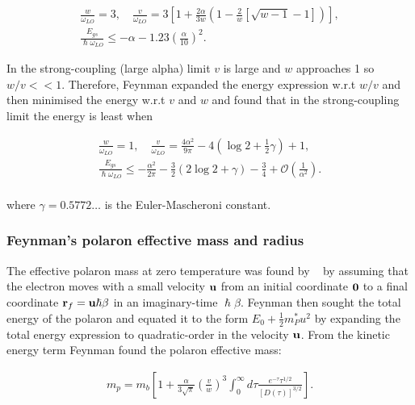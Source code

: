 \begin{equation}
\begin{gathered}
    \label{eqn:weak_gs_feynman}
    \frac{w}{\omega_{LO}} = 3, \quad \frac{v}{\omega_{LO}} = 3 \left[ 1 + \frac{2\alpha}{3w} \left(1 -\frac{2}{w} \left[ \sqrt{w-1}-1 \right] \right) \right] ,\\
    \frac{E_{gs}}{\hslash\omega_{LO}} \leq -\alpha - 1.23 \left(\frac{\alpha}{10}\right)^2 .
\end{gathered}
\end{equation}

In the strong-coupling (large alpha) limit $v$ is large and $w$ approaches 1 so $w / v << 1$. Therefore, Feynman expanded the energy expression w.r.t $w / v$ and then minimised the energy w.r.t $v$ and $w$ and found that in the strong-coupling limit the energy is least when 

\begin{equation}
\begin{gathered}
    \label{eqn:strong_gs_feynman}
    \frac{w}{\omega_{LO}} = 1, \quad \frac{v}{\omega_{LO}} = \frac{4\alpha^2}{9\pi} - 4\left( \log2 + \frac{1}{2} \gamma \right) + 1 , \\
    \frac{E_{gs}}{\hslash\omega_{LO}} \leq -\frac{\alpha^2}{2\pi} - \frac{3}{2}(2\log2+\gamma)-\frac{3}{4} + \mathcal{O}\left(\frac{1}{\alpha^2}\right) . \\
\end{gathered}
\end{equation}

where $\gamma = 0.5772 \dots$ is the Euler-Mascheroni constant. 

\subsubsection{Feynman's polaron effective mass and radius}

The effective polaron mass at zero temperature was found by ~\cite{feynman_slow_1955} by assuming that the electron moves with a small velocity $\vb{u}$ from an initial coordinate $\vb{0}$ to a final coordinate $\vb{r}_f = \vb{u} \hslash\beta$ in an imaginary-time $\hslash\beta$. Feynman then sought the total energy of the polaron and equated it to the form $E_0 + \frac{1}{2}m^*_P u^2$ by expanding the total energy expression to quadratic-order in the velocity $\vb{u}$. From the kinetic energy term Feynman found the polaron effective mass:

\begin{equation}
\begin{gathered}
    \label{eqn:mass_feynman}
    m_p = m_b \left[ 1 + \frac{\alpha}{3\sqrt{\pi}} \left(\frac{v}{w}\right)^3 \int^\infty_0 d\tau \frac{e^{-\tau} \tau^{1/2}}{\left[D(\tau)\right]^{3/2}} \right].
\end{gathered}
\end{equation}

